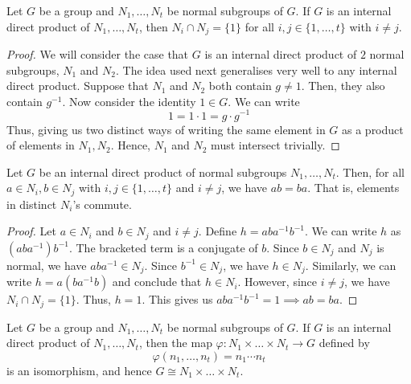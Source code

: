 \begin{prop} \label{prop:idp-trivial-intersection}
    Let $G$ be a group and $N_1, \ldots, N_t$ be normal subgroups of $G$. If $G$ is an internal direct product of $N_1, \ldots, N_t$, then $N_i \cap N_j = \{1\}$ for all $i,j \in \{1,\ldots,t\}$ with $i \neq j$.
\end{prop}
\begin{proof}
    We will consider the case that $G$ is an internal direct product of $2$ normal subgroups, $N_1$ and $N_2$. The idea used next generalises very well to any internal direct product. Suppose that $N_1$ and $N_2$ both contain $g \neq 1$. Then, they also contain $g^{-1}$. Now consider the identity $1 \in G$. We can write
    \[
        1 = 1 \cdot 1 = g \cdot g^{-1}
    \]
    Thus, giving us two distinct ways of writing the same element in $G$ as a product of elements in $N_1, N_2$. Hence, $N_1$ and $N_2$ must intersect trivially.
\end{proof}

\begin{lem} \label{lem:distinct-idp-commute}
    Let $G$ be an internal direct product of normal subgroups $N_1, \ldots, N_t$. Then, for all $a \in N_i, b \in N_j$ with $i,j \in \{1, \ldots, t\}$ and $i\neq j$, we have $ab = ba$. That is, elements in distinct $N_i$'s commute. 
\end{lem}
\begin{proof}
    Let $a \in N_i$ and $b \in N_j$ and $i \neq j$. Define $h = aba^{-1}b^{-1}$. We can write $h$ as $(aba^{-1})b^{-1}$. The bracketed term is a conjugate of $b$. Since $b \in N_j$ and $N_j$ is normal, we have $aba^{-1} \in N_j$. Since $b^{-1} \in N_j$, we have $h \in N_j$. Similarly, we can write $h = a(ba^{-1}b)$ and conclude that $h \in N_i$. However, since $i \neq j$, we have $N_i \cap N_j = \{1\}$. Thus, $h = 1$. This gives us $aba^{-1}b^{-1} = 1 \implies ab = ba$.
\end{proof}

\begin{theorem} \label{thm:group-isomorphic-to-product}
    Let $G$ be a group and $N_1, \ldots, N_t$ be normal subgroups of $G$. If $G$ is an internal direct product of $N_1, \ldots, N_t$, then the map $\varphi \colon N_1 \times \ldots \times N_t \to G$ defined by
    \[
        \varphi(n_1, \ldots, n_t) = n_1 \cdots n_t
    \]
    is an isomorphism, and hence $G \cong N_1 \times \ldots \times N_t$.
\end{theorem}

